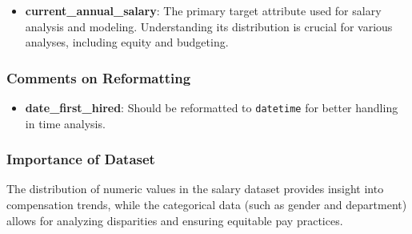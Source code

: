 \documentclass[11pt]{article}
\providecommand{\tightlist}{%
      \setlength{\itemsep}{0pt}\setlength{\parskip}{0pt}}
\begin{document}
\begin{itemize}
\tightlist
\item
  \textbf{current\_annual\_salary}: The primary target attribute used
  for salary analysis and modeling. Understanding its distribution is
  crucial for various analyses, including equity and budgeting.
\end{itemize}

\subsubsection{Comments on Reformatting}\label{comments-on-reformatting}

\begin{itemize}
\tightlist
\item
  \textbf{date\_first\_hired}: Should be reformatted to
  \texttt{datetime} for better handling in time analysis.
\end{itemize}

\subsubsection{Importance of Dataset}\label{importance-of-dataset}

The distribution of numeric values in the salary dataset provides
insight into compensation trends, while the categorical data (such as
gender and department) allows for analyzing disparities and ensuring
equitable pay practices.
\end{document}
